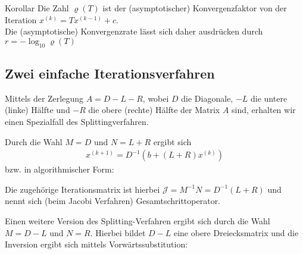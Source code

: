 \begin{colbox}{Korollar} 
  Die Zahl $\varrho(T)$ ist der (asymptotischer) Konvergenzfaktor von der Iteration $x^{(k)}=Tx^{(k-1)}+c$. \\
  Die (asymptotische) Konvergenzrate lässt sich daher ausdrücken durch $r=-\log_{10}\varrho(T)$
\end{colbox}

\subsection{Zwei einfache Iterationsverfahren}

Mittels der Zerlegung $A=D-L-R$, wobei $D$ die Diagonale, $-L$ die untere (linke) Hälfte 
und $-R$ die obere (rechte) Hälfte der Matrix $A$ sind, erhalten wir einen Spezialfall des Splittingverfahren. 

Durch die Wahl $M=D$ und $N=L+R$ ergibt sich 
%
\begin{align*}
  x^{(k+1)}=D^{-1}(b + (L+R)x^{(k)})
\end{align*}
%
bzw. in algorithmischer Form:

Die zugehörige Iterationsmatrix ist hierbei $\mathcal{J}=M^{-1}N = D^{-1}(L+R)$ 
und nennt sich (beim Jacobi Verfahren) Gesamtschrittoperator. 

Einen weitere Version des Splitting-Verfahren ergibt sich durch die Wahl $M=D-L$ und $N=R$.
Hierbei bildet $D-L$ eine obere Dreiecksmatrix und die Inversion ergibt sich mittels Vorwärtssubstitution: 

